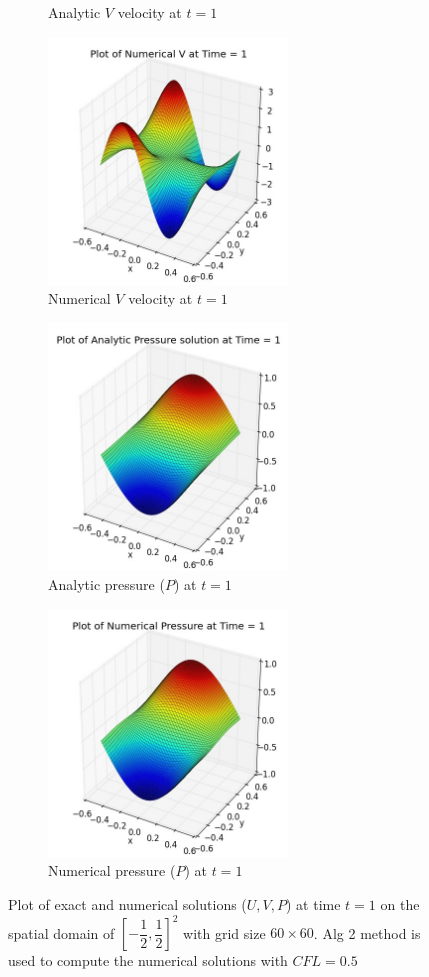 \begin{figure}[H]
\begin{subfigure}[t]{2.5in}
		\caption{Analytic $V$ velocity at $t=1$}\label{fig:7.1c}
	\end{subfigure}
	\quad
	\begin{subfigure}[t]{2.5in}
		\centering
		\includegraphics[width=2.5in]{figures/Pm1b_pf2b_vf_t_1_grid_60.jpg}
		\caption{Numerical $V$ velocity at $t=1$}\label{fig:7.1d}
	\end{subfigure}
	\quad	
	\begin{subfigure}[t]{2.5in}
		\centering
		\includegraphics[width=2.5in]{figures/Pm1b_pf2b_P_exact_t_1_grid_60.jpg}
		\caption{Analytic pressure ($P$) at $t=1$}\label{fig:7.1e}
	\end{subfigure}
	\quad	
	\begin{subfigure}[t]{2.5in}
		\centering
		\includegraphics[width=2.5in]{figures/Pm1b_pf2b_pf_t_1_grid_60.jpg}
		\caption{Numerical pressure ($P$) at $t=1$}\label{fig:7.1f}
	\end{subfigure}
	\caption{Plot of exact and numerical solutions ($U,V,P$) at time $t=1$ on the spatial domain of $[-\dfrac{1}{2},\dfrac{1}{2}]^2$ with grid size $60 \times 60$. Alg 2 method is used to compute the numerical solutions with $CFL=0.5$}\label{fig:7.1}
\end{figure}

